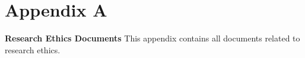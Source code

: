 %
%
%                 
\chapter{Appendix A}
\label{sec:appendixa}


\textbf{Research Ethics Documents}
\newline
This appendix contains all documents related to research ethics.

